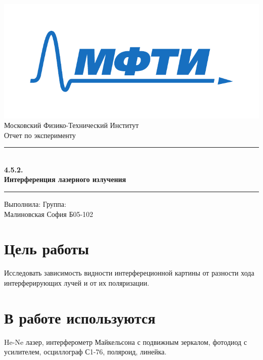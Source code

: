 \documentclass[a4paper,12pt]{article}
\begin{document}
\begin{titlepage}
		\vspace*{\fill}
		
		\begin{center}
			\includegraphics[scale=0.8]{MIPT.pdf}
			\\[0.7cm]\Huge Московский Физико-Технический Институт
			\\[2cm]\LARGE Отчет по эксперименту
			\\[0.5cm]\noindent\rule{\textwidth}{1pt}
			\\\Huge\textbf{4.5.2. \\ Интерференция лазерного излучения}
			\\[-0.5cm]\noindent\rule{\textwidth}{1pt}
		\end{center}
		
		\vspace*{\fill}
		
		\begin{flushleft}
			Выполнила: \hspace{\fill} Группа:
			\\Малиновская София \hspace{\fill} Б05-102
		\end{flushleft}
	\end{titlepage}

	\setcounter{page}{2}

\section*{Цель работы} 
Исследовать зависимость видности интерфереционной картины от разности хода интерферирующих лучей и от их поляризации.

\section*{В работе используются}
He-Ne лазер, интерферометр Майкельсона с подвижным зеркалом, фотодиод с усилителем, осциллограф С1-76, поляроид, линейка.
\end{document}
